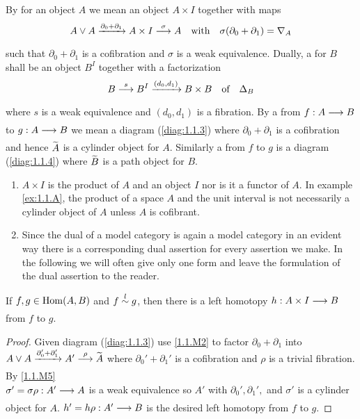 \documentclass[../main]{subfiles}
\begin{document}
\begin{definition}\label{def:1.1.4}
	By  for an object $A$ we mean an object $A\times I$ together with maps 
	\[A\vee A \varrightarrow{\partial_0+\partial_1}A\times I\varrightarrow{\sigma} A \quad \text{with}\quad \sigma(\partial_0+\partial_1)=\nabla_A\]
	such that $\partial_0+\partial_1$ is a cofibration and $\sigma$ is a weak equivalence. Dually, a  for $B$ shall be an object $B^I$ together with a factorization 
	\[B\varrightarrow{s}B^I\varrightarrow{(d_0,d_1)}B\times B\quad \text{of}\quad \Delta_B\]
	where $s$ is a weak equivalence and $(d_0,d_1)$ is a fibration. By a  from $f:A\varrightarrow{}B$ to $g:A\varrightarrow{}B$ we mean a diagram (\ref{diag:1.1.3}) where $\partial_0+\partial_1$ is a cofibration and hence $\xtilde{A}$ is a cylinder object for $A$. Similarly a  from $f$ to $g$ is a diagram (\ref{diag:1.1.4}) where $\xtilde{B}$ is a path object for $B$.
\end{definition}

\begin{remark*}
	\begin{enumerate}[label= \arabic*.]
		\item $A\times I$ is  the product of $A$ and an object $I$ nor is it a functor of $A$. In example \ref{ex:1.1.A}, the product of a space $A$ and the unit interval is not necessarily a cylinder object of $A$ unless $A$ is cofibrant.
		\item Since the dual of a model category is again a model category in an evident way there is a corresponding dual assertion for every assertion we make. In the following we will often give only one form and leave the formulation of the dual assertion to the reader.
	\end{enumerate}
\end{remark*}

\begin{lemma}\label{lem:1.1.1}
	If $f,g\in \operatorname{Hom}(A,B)$ and $f\overset{l}{\sim} g$, then there is a left homotopy $h:A\times I\varrightarrow{} B$ from $f$ to $g$.
\end{lemma}

\begin{proof}
	Given diagram (\ref{diag:1.1.3}) use \ref{1.1.M2} to factor $\partial_0+\partial_1$ into $A\vee A \varrightarrow{\partial_0'+\partial_1'} A' \varrightarrow{\rho} \xtilde{A}$ where $\partial_0'+\partial_1'$ is a cofibration and $\rho$ is a trivial fibration. By \ref{1.1.M5} \\ $\sigma'=\sigma \rho:A'\varrightarrow{}A$ is a weak equivalence so $A'$ with $\partial_0',\partial_1',$ and $\sigma'$ is a cylinder object for $A$. $h'=h\rho:A'\varrightarrow{}B$ is the desired left homotopy from $f$ to $g$.
\end{proof}
\end{document}
